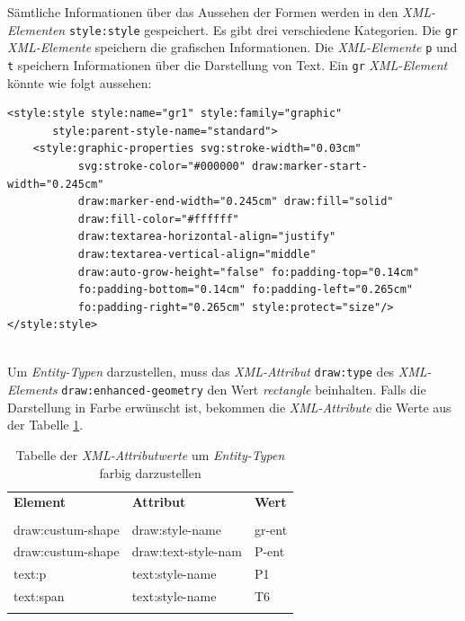 \noindent
Sämtliche Informationen über das Aussehen der Formen werden in den \textit{XML-Elementen} \verb|style:style| gespeichert. Es gibt drei verschiedene Kategorien. Die \verb|gr| \textit{XML-Elemente} speichern die grafischen Informationen. Die \textit{XML-Elemente} \verb|p| und \verb|t| speichern Informationen über die Darstellung von Text. Ein \verb|gr| \textit{XML-Element} könnte wie folgt aussehen:

\begin{verbatim}
<style:style style:name="gr1" style:family="graphic" 
       style:parent-style-name="standard">
    <style:graphic-properties svg:stroke-width="0.03cm" 
           svg:stroke-color="#000000" draw:marker-start-width="0.245cm"
           draw:marker-end-width="0.245cm" draw:fill="solid" 
           draw:fill-color="#ffffff"
           draw:textarea-horizontal-align="justify" 
           draw:textarea-vertical-align="middle"
           draw:auto-grow-height="false" fo:padding-top="0.14cm"
           fo:padding-bottom="0.14cm" fo:padding-left="0.265cm"
           fo:padding-right="0.265cm" style:protect="size"/>
</style:style>
\end{verbatim}
\noindent
\hon{}
\\
\noindent
Um \textit{Entity-Typen} darzustellen, muss das \textit{XML-Attribut} \verb|draw:type| des \textit{XML-Elements} \verb|draw:enhanced-geometry| den Wert \textit{rectangle} beinhalten. Falls die Darstellung in Farbe erwünscht ist, bekommen die \textit{XML-Attribute} die Werte aus der Tabelle \ref{tbl:beispieltabelle1}.
\begin{table}[h]
	\centering
	\begin{tabular}{lll}
		\textbf{Element} & \textbf{Attribut}  & \textbf{Wert} \\
		\\
		draw:custum-shape & draw:style-name           & gr-ent             \\
		draw:custum-shape & draw:text-style-nam      & P-ent             \\
		text:p & text:style-name       & P1             \\
		text:span & text:style-name       & T6             \\
		\\
	\end{tabular}
	
	\caption{Tabelle der \textit{XML-Attributwerte} um \textit{Entity-Typen} farbig darzustellen}
	\label{tbl:beispieltabelle1}
	
\end{table}
\noindent
\hon{}
\\

